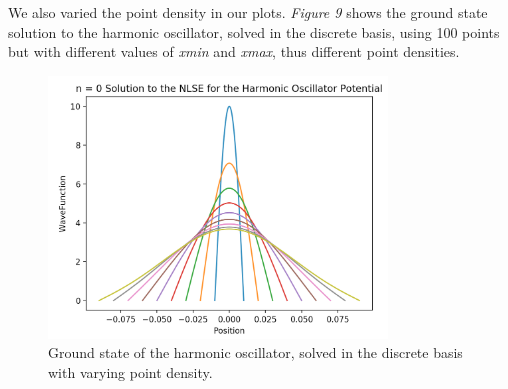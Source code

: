 \documentclass[%
 reprint,
 amsmath,amssymb,
 aps,
]{revtex4-1}
\begin{document}
\noindent We also varied the point density in our plots.  \textit{Figure 9} shows the ground state solution to the harmonic oscillator, solved in the discrete basis, using 100 points but with different values of \textit{xmin} and \textit{xmax}, thus different point densities.\\

\begin{figure}
\includegraphics[width=9cm]{DiscreteHarmonicOscillatorPointDensity}
\caption{Ground state of the harmonic oscillator, solved in the discrete basis with varying point density.}
\end{figure}
\end{document}
